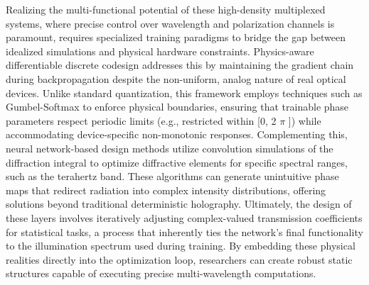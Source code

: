 Realizing the multi-functional potential of these high-density multiplexed systems, where precise control over wavelength and polarization channels is paramount, requires specialized training paradigms to bridge the gap between idealized simulations and physical hardware constraints. Physics-aware differentiable discrete codesign addresses this by maintaining the gradient chain during backpropagation despite the non-uniform, analog nature of real optical devices. Unlike standard quantization, this framework employs techniques such as Gumbel-Softmax to enforce physical boundaries, ensuring that trainable phase parameters respect periodic limits (e.g., restricted within {[}0, 2 \(\pi\) {]}) while accommodating device-specific non-monotonic responses. \citep{doi_10_1145_3508352_3549378_13c53996} Complementing this, neural network-based design methods utilize convolution simulations of the diffraction integral to optimize diffractive elements for specific spectral ranges, such as the terahertz band. These algorithms can generate unintuitive phase maps that redirect radiation into complex intensity distributions, offering solutions beyond traditional deterministic holography. Ultimately, the design of these layers involves iteratively adjusting complex-valued transmission coefficients for statistical tasks, a process that inherently ties the network's final functionality to the illumination spectrum used during training. By embedding these physical realities directly into the optimization loop, researchers can create robust static structures capable of executing precise multi-wavelength computations. \citep{doi_10_1145_3508352_3549378_13c53996} \citep{doi_10_1109_tthz_2023_3344020_a0a550ba} \citep{doi_10_1021_acsphotonics_0c01583_7c90196c}

